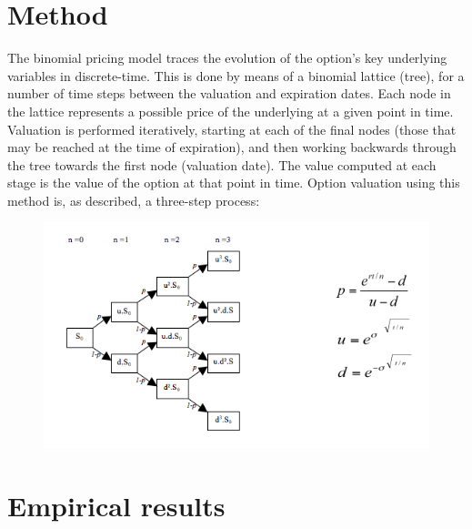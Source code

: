\documentclass[11pt, titlepage]{article}
\begin{document}
\section{Method}{
The binomial pricing model traces the evolution of the option's key underlying variables in discrete-time. This is done by means of a binomial lattice (tree), for a number of time steps between the valuation and expiration dates. Each node in the lattice represents a possible price of the underlying at a given point in time. Valuation is performed iteratively, starting at each of the final nodes (those that may be reached at the time of expiration), and then working backwards through the tree towards the first node (valuation date). The value computed at each stage is the value of the option at that point in time.
Option valuation using this method is, as described, a three-step process:

\begin{figure}[H]
\flushright
\includegraphics[scale=1]{Binomtree}
\end{figure}
}
\vfill
\clearpage

\newpage
\section{Empirical results}
\end{document}
